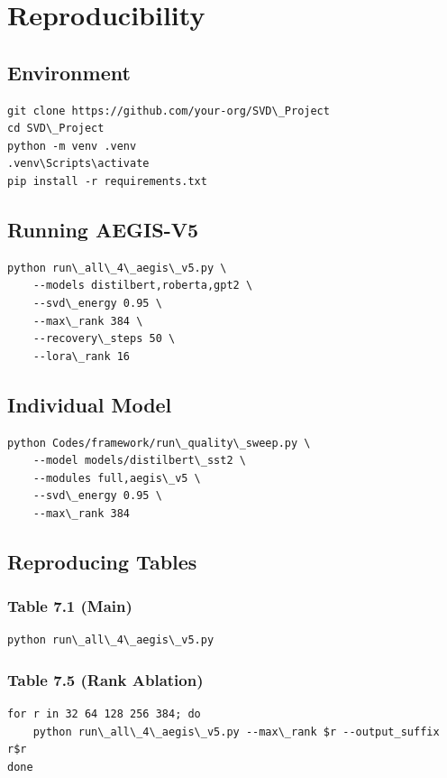 \section{Reproducibility}

\subsection{Environment}

\begin{lstlisting}
git clone https://github.com/your-org/SVD\_Project
cd SVD\_Project
python -m venv .venv
.venv\Scripts\activate
pip install -r requirements.txt
\end{lstlisting}

\subsection{Running AEGIS-V5}

\begin{lstlisting}
python run\_all\_4\_aegis\_v5.py \
    --models distilbert,roberta,gpt2 \
    --svd\_energy 0.95 \
    --max\_rank 384 \
    --recovery\_steps 50 \
    --lora\_rank 16
\end{lstlisting}

\subsection{Individual Model}

\begin{lstlisting}
python Codes/framework/run\_quality\_sweep.py \
    --model models/distilbert\_sst2 \
    --modules full,aegis\_v5 \
    --svd\_energy 0.95 \
    --max\_rank 384
\end{lstlisting}

\subsection{Reproducing Tables}

\subsubsection{Table 7.1 (Main)}
\begin{lstlisting}
python run\_all\_4\_aegis\_v5.py
\end{lstlisting}

\subsubsection{Table 7.5 (Rank Ablation)}
\begin{lstlisting}
for r in 32 64 128 256 384; do
    python run\_all\_4\_aegis\_v5.py --max\_rank $r --output_suffix r$r
done
\end{lstlisting}

